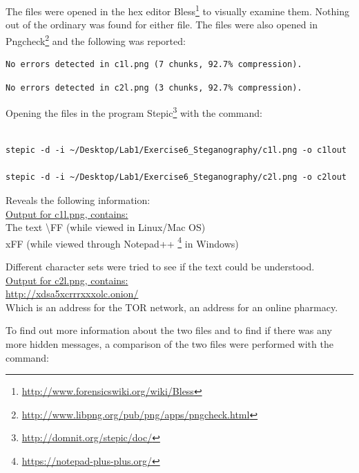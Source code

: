 \documentclass[a4paper,10pt,oneside]{article}
\begin{document}
The files were opened in the hex editor Bless\footnote{\url{http://www.forensicswiki.org/wiki/Bless}}
to visually examine them. Nothing out of the ordinary was found for either file.
The files were also opened in Pngcheck\footnote{\url{http://www.libpng.org/pub/png/apps/pngcheck.html}}
and the following was reported:


\begin{lstlisting}[caption=c1l.png]
No errors detected in c1l.png (7 chunks, 92.7% compression).
\end{lstlisting}

\begin{lstlisting}[caption=c2l.png]
No errors detected in c2l.png (3 chunks, 92.7% compression).
\end{lstlisting}

Opening the files in the program Stepic\footnote{\url{http://domnit.org/stepic/doc/}}
with the command:

\begin{lstlisting}[caption=stepic command]

stepic -d -i ~/Desktop/Lab1/Exercise6_Steganography/c1l.png -o c1lout

stepic -d -i ~/Desktop/Lab1/Exercise6_Steganography/c2l.png -o c2lout

\end{lstlisting}

Reveals the following information:\\

\underline{Output for c1l.png, contains:}\\
\newline
The text \textbackslash FF (while viewed in Linux/Mac OS)\\xFF (while viewed through Notepad++
\footnote{\url{https://notepad-plus-plus.org/}}
in Windows)
\newline

Different character sets were tried to see if the text could be understood.\\


\underline{Output for c2l.png, contains:}\\
\newline
\url{http://xdsa5xcrrrxxxolc.onion/}\\

Which is an address for the TOR network, an address for an online pharmacy.


To find out more information about the two files and to find if there was any more hidden messages, a comparison of the two files were performed with the command:\\
\end{document}
